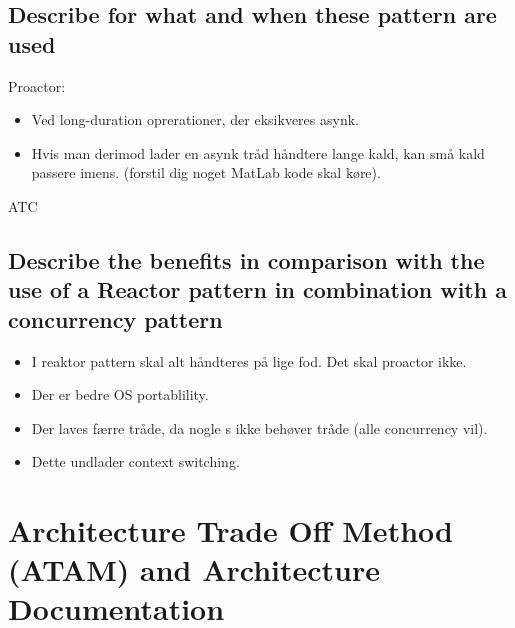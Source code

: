 \documentclass{article}
\begin{document}
\subsection{Describe for what and when these pattern are used}

Proactor:
\vspace{-10pt}
\begin{itemize}
	\item Ved long-duration oprerationer, der eksikveres asynk.
	\item Hvis man derimod lader en asynk tråd håndtere lange kald, kan små kald passere imens. (forstil dig noget MatLab kode skal køre).
\end{itemize}

ATC


\subsection{Describe the benefits in comparison with the use of a Reactor pattern in combination with a concurrency pattern}


\begin{itemize}
	\item I reaktor pattern skal alt håndteres på lige fod. Det skal proactor ikke.
	\item Der er bedre OS portablility.
	\item Der laves færre tråde, da nogle s ikke behøver tråde (alle concurrency vil).
	\item Dette undlader context switching.
\end{itemize}






\newpage
\section{Architecture Trade Off Method (ATAM) and Architecture Documentation}
\end{document}
